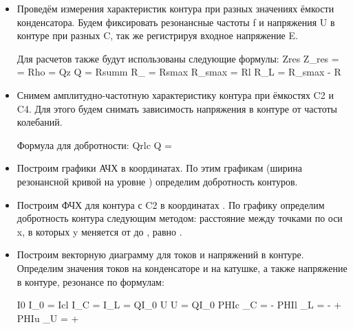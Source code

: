 \begin{itemize}
    \item Проведём измерения характеристик контура при разных значениях ёмкости конденсатора. Будем фиксировать резонансные частоты f и напряжения U в контуре при разных C, так же регистрируя входное напряжение E.

    Для расчетов также будут использованы следующие формулы:
    \formula
    {}
    {Zres}
    {Z_{res} =  = }
    \formula
    {}
    {Rho}
    {\rho = }
    \formula
    {}
    {Qz}
    {Q = }
    \formula
    {}
    {Rsumm}
    {R_{\Sigma} = }
    \formula
    {}
    {Rsmax}
    {R_{smax} = }
    \formula
    {}
    {Rl}
    {R_L = R_{smax} - R}

    \item Снимем амплитудно-частотную характеристику контура при ёмкостях C2 и C4. Для этого будем снимать зависимость напряжения в контуре от частоты колебаний.

    \formula
    {Формула для добротности:}
    {Qrlc}
    {Q  =}

    \item Построим графики АЧХ в координатах. По этим графикам (ширина резонансной кривой на уровне ) определим добротность контуров.

    \item Построим ФЧХ для контура с C2 в координатах . По графику определим добротность контура следующим методом: расстояние между точками по оси x, в которых y меняется от  до , равно .

\newpage

    \item Построим векторную диаграмму для токов и напряжений в контуре. Определим значения токов на конденсаторе и на катушке, а также напряжение в контуре, резонансе по формулам:

    \formula
    {}
    {I0}
    {I_0 = }
    \formula
    {}
    {Icl}
    {I_C = I_L = QI_0}
    \formula
    {}
    {U}
    {U = Q\rho I_0}
    \formula
    {}
    {PHIc}
    {\phi_C =  - }
    \formula
    {}
    {PHIl}
    {\phi_L = - + \delta}
    \formula
    {}
    {PHIu}
    {\phi_U =  + \delta}

\end{itemize}